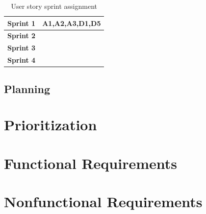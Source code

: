 \begin{table}
\begin{tabular}{ | l | l | }
  \hline
  \textbf{Sprint 1} & A1,A2,A3,D1,D5 \\ \hline
  \textbf{Sprint 2} &  \\ \hline
  \textbf{Sprint 3} &  \\ \hline
  \textbf{Sprint 4} &  \\ \hline
\end{tabular}
\caption{User story sprint assignment}
\end{table}



\subsection{Planning}

\section{Prioritization}



\section{Functional Requirements}
\section{Nonfunctional Requirements}

